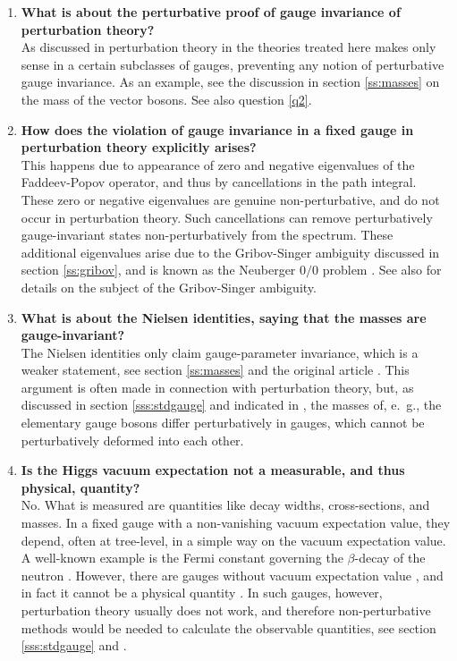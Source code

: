 \documentclass[final,12pt]{article}
\newcommand*{\1}{1\!\!\!\bot}
\begin{document}
\begin{enumerate}
 \item {\bf What is about the perturbative proof of gauge invariance of perturbation theory?}\\
 As discussed in \cite{Lee:1974zg} perturbation theory in the theories treated here makes only sense in a certain subclasses of gauges, preventing any notion of perturbative gauge invariance. As an example, see the discussion in section \ref{ss:masses} on the mass of the vector bosons. See also question \ref{q2}.
 
 \item {\bf How does the violation of gauge invariance in a fixed gauge in perturbation theory explicitly arises?}\\
 This happens due to appearance of zero and negative eigenvalues of the Faddeev-Popov operator, and thus by cancellations in the path integral. These zero or negative eigenvalues are genuine non-perturbative, and do not occur in perturbation theory. Such cancellations can remove perturbatively gauge-invariant states non-perturbatively from the spectrum. These additional eigenvalues arise due to the Gribov-Singer ambiguity discussed in section \ref{ss:gribov}, and is known as the Neuberger $0/0$ problem \cite{Neuberger:1986xz}. See also \cite{Maas:2011se} for details on the subject of the Gribov-Singer ambiguity.
 
 \item {\bf What is about the Nielsen identities, saying that the masses are gauge-invariant?}\\
 The Nielsen identities only claim gauge-parameter invariance, which is a weaker statement, see section \ref{ss:masses} and the original article \cite{Nielsen:1975fs}. This argument is often made in connection with perturbation theory, but, as discussed in section \ref{sss:stdgauge} and indicated in \cite{Lee:1974zg}, the masses of, e.\ g., the elementary gauge bosons differ perturbatively in gauges, which cannot be perturbatively deformed into each other.
 
 \item {\bf Is the Higgs vacuum expectation not a measurable, and thus physical, quantity?}\\
 No. What is measured are quantities like decay widths, cross-sections, and masses. In a fixed gauge with a non-vanishing vacuum expectation value, they depend, often at tree-level, in a simple way on the vacuum expectation value. A well-known example is the Fermi constant governing the $\beta$-decay of the neutron \cite{Bohm:2001yx}. However, there are gauges without vacuum expectation value \cite{Maas:2012ct,Lee:1974zg}, and in fact it cannot be a physical quantity \cite{Osterwalder:1977pc,Seiler:2015rwa,Fradkin:1978dv}. In such gauges, however, perturbation theory usually does not work, and therefore non-perturbative methods would be needed to calculate the observable quantities, see section \ref{sss:stdgauge} and \cite{Lee:1974zg}.
 

\end{enumerate}
\end{document}

